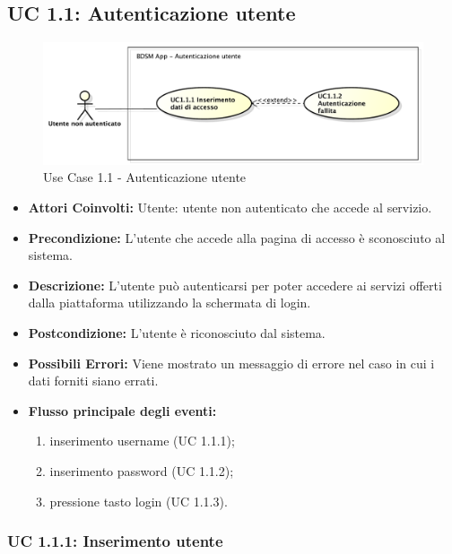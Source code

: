 \subsection{UC 1.1: Autenticazione utente}

\begin{figure}[htbp]
    \centering
    \centerline{\includegraphics[scale=0.5]{./images/UC1_1.pdf}}
    \caption{Use Case 1.1 - Autenticazione utente}
\end{figure}


\begin{itemize}
    \item \textbf{Attori Coinvolti:}
    Utente: utente non autenticato che accede al servizio.
    \item \textbf{Precondizione:}
    L'utente che accede alla pagina di accesso è sconosciuto al sistema.
    \item \textbf{Descrizione:}
    L'utente può autenticarsi per poter accedere ai servizi offerti dalla piattaforma utilizzando la schermata di login.
    \item \textbf{Postcondizione:}
    L'utente è riconosciuto dal sistema.
    \item \textbf{Possibili Errori:}
    Viene mostrato un messaggio di errore nel caso in cui i dati forniti siano errati.
    \item \textbf{Flusso principale degli eventi:}

    \begin{enumerate}
        \item inserimento username (UC 1.1.1);
        \item inserimento password (UC 1.1.2);
        \item pressione tasto login (UC 1.1.3).
    \end{enumerate}

\end{itemize}

\subsubsection{UC 1.1.1: Inserimento utente}

